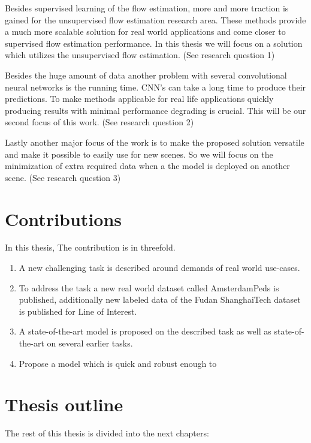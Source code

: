 Besides supervised learning of the flow estimation, more and more traction is gained for the unsupervised flow estimation research area. These methods provide a much more scalable solution for real world applications and come closer to supervised flow estimation performance. In this thesis we will focus on a solution which utilizes the unsupervised flow estimation. (See research question 1)

Besides the huge amount of data another problem with several convolutional neural networks is the running time. CNN’s can take a long time to produce their predictions. To make methods applicable for real life applications quickly producing results with minimal performance degrading is crucial. This will be our second focus of this work. (See research question 2)

Lastly another major focus of the work is to make the proposed solution versatile and make it possible to easily use for new scenes. So we will focus on the minimization of extra required data when a the model is deployed on another scene. (See research question 3)

\section{Contributions}
In this thesis, The contribution is in threefold.
\begin{enumerate}
	\item A new challenging task is described around demands of real world use-cases.
	\item To address the task a new real world dataset called AmsterdamPeds is published, additionally new labeled data of the Fudan ShanghaiTech dataset \cite{Fang2019} is published for Line of Interest.
	\item A state-of-the-art model is proposed on the described task as well as state-of-the-art on several earlier tasks.
	\item Propose a model which is quick and robust enough to 
\end{enumerate}

\section{Thesis outline}
The rest of this thesis is divided into the next chapters:

